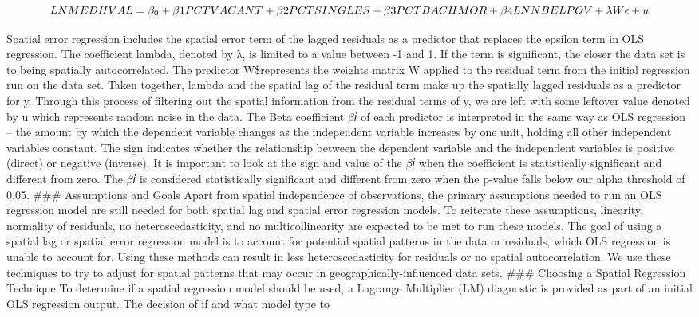 \documentclass[
]{article}
\begin{document}
\[LNMEDHVAL = \beta_0 + \beta1 PCTVACANT + \beta2 PCTSINGLES \\ + \beta3 PCTBACHMOR + \beta4 LNNBELPOV + \lambda W\epsilon + u\]

Spatial error regression includes the spatial error term of the lagged
residuals as a predictor that replaces the epsilon term in OLS
regression. The coefficient lambda, denoted by λ, is limited to a value
between -1 and 1. If the term is significant, the closer the data set is
to being spatially autocorrelated. The predictor W\$\epsilon represents
the weights matrix W applied to the residual term from the initial
regression run on the data set. Taken together, lambda and the spatial
lag of the residual term make up the spatially lagged residuals as a
predictor for y. Through this process of filtering out the spatial
information from the residual terms of y, we are left with some leftover
value denoted by u which represents random noise in the data. The Beta
coefficient \(\beta\)𝑖 of each predictor is interpreted in the same way
as OLS regression -- the amount by which the dependent variable changes
as the independent variable increases by one unit, holding all other
independent variables constant. The sign indicates whether the
relationship between the dependent variable and the independent
variables is positive (direct) or negative (inverse). It is important to
look at the sign and value of the \(\beta\)𝑖 when the coefficient is
statistically significant and different from zero. The \(\beta\)𝑖 is
considered statistically significant and different from zero when the
p-value falls below our alpha threshold of 0.05. \#\#\# Assumptions and
Goals Apart from spatial independence of observations, the primary
assumptions needed to run an OLS regression model are still needed for
both spatial lag and spatial error regression models. To reiterate these
assumptions, linearity, normality of residuals, no heteroscedasticity,
and no multicollinearity are expected to be met to run these models. The
goal of using a spatial lag or spatial error regression model is to
account for potential spatial patterns in the data or residuals, which
OLS regression is unable to account for. Using these methods can result
in less heteroscedasticity for residuals or no spatial autocorrelation.
We use these techniques to try to adjust for spatial patterns that may
occur in geographically-influenced data sets. \#\#\# Choosing a Spatial
Regression Technique To determine if a spatial regression model should
be used, a Lagrange Multiplier (LM) diagnostic is provided as part of an
initial OLS regression output. The decision of if and what model type to
\end{document}
